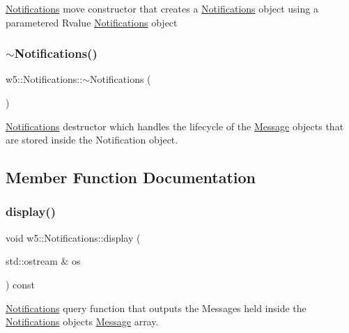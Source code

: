 \mbox{\hyperlink{classw5_1_1Notifications}{Notifications}} move constructor that creates a \mbox{\hyperlink{classw5_1_1Notifications}{Notifications}} object using a parametered Rvalue \mbox{\hyperlink{classw5_1_1Notifications}{Notifications}} object \mbox{\label{classw5_1_1Notifications_a657e031fdb6442a8aacb968ce351c569}} 
\subsubsection{\texorpdfstring{$\sim$\+Notifications()}{~Notifications()}}
{\footnotesize\ttfamily w5\+::\+Notifications\+::$\sim$\+Notifications (\begin{DoxyParamCaption}{ }\end{DoxyParamCaption})}

\mbox{\hyperlink{classw5_1_1Notifications}{Notifications}} destructor which handles the lifecycle of the \mbox{\hyperlink{classw5_1_1Message}{Message}} objects that are stored inside the Notification object. 

\subsection{Member Function Documentation}
\mbox{\label{classw5_1_1Notifications_a0272d577ac9277d500118d635b460670}} 
\subsubsection{\texorpdfstring{display()}{display()}}
{\footnotesize\ttfamily void w5\+::\+Notifications\+::display (\begin{DoxyParamCaption}\item[{std\+::ostream \&}]{os }\end{DoxyParamCaption}) const}

\mbox{\hyperlink{classw5_1_1Notifications}{Notifications}} query function that outputs the Messages held inside the \mbox{\hyperlink{classw5_1_1Notifications}{Notifications}} object\textquotesingle{}s \mbox{\hyperlink{classw5_1_1Message}{Message}} array. \mbox{\label{classw5_1_1Notifications_a9cca3e863b2e21351fdfc096386adc1e}} 
